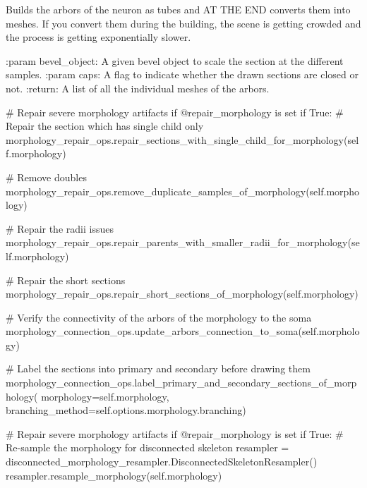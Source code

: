 \begin{DoxyVerb}Builds the arbors of the neuron as tubes and AT THE END converts them into meshes.
If you convert them during the building, the scene is getting crowded and the process is
getting exponentially slower.

:param bevel_object: A given bevel object to scale the section at the different samples.
:param caps: A flag to indicate whether the drawn sections are closed or not.
:return: A list of all the individual meshes of the arbors.
\end{DoxyVerb}
 \begin{DoxyVerb}# Repair severe morphology artifacts if @repair_morphology is set
if True:
    # Repair the section which has single child only
    morphology_repair_ops.repair_sections_with_single_child_for_morphology(self.morphology)

    # Remove doubles
    morphology_repair_ops.remove_duplicate_samples_of_morphology(self.morphology)

    # Repair the radii issues
    morphology_repair_ops.repair_parents_with_smaller_radii_for_morphology(self.morphology)

    # Repair the short sections
    morphology_repair_ops.repair_short_sections_of_morphology(self.morphology)

# Verify the connectivity of the arbors of the morphology to the soma
morphology_connection_ops.update_arbors_connection_to_soma(self.morphology)

# Label the sections into primary and secondary before drawing them
morphology_connection_ops.label_primary_and_secondary_sections_of_morphology(
    morphology=self.morphology, branching_method=self.options.morphology.branching)

# Repair severe morphology artifacts if @repair_morphology is set
if True:
    # Re-sample the morphology for disconnected skeleton
    resampler = disconnected_morphology_resampler.DisconnectedSkeletonResampler()
    resampler.resample_morphology(self.morphology)
\end{DoxyVerb}

